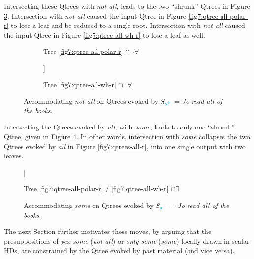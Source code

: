 Intersecting these Qtrees with \textit{not all}, leads to the two ``shrunk'' Qtrees in Figure \ref{fig7:qtrees-all-inter-notall}. Intersection with \textit{not all} caused the input Qtree in Figure \ref{fig7:qtree-all-polar-r} to lose a leaf and be reduced to a single root. Intersection with \textit{not all} caused the input Qtree in Figure \ref{fig7:qtree-all-wh-r} to lose a leaf as well.

\begin{figure}[H]
	\centering
	\begin{subfigure}[b]{.45\linewidth}
		\centering
		\begin{forest}
		\end{forest}
		\caption[]{Tree \ref{fig7:qtree-all-polar-r} $\cap\neg\forall$}\label{fig7:qtree-all-polar-inter-notall}
	\end{subfigure}
	\hfill
	\begin{subfigure}[b]{.45\linewidth}
		\centering
		\begin{forest}
			[{CS$\cap\neg\forall$}[$\neg\exists$][$\exists\wedge\neg\forall$]]
		\end{forest}
		\caption[]{Tree \ref{fig7:qtree-all-wh-r} $\cap\neg\forall$.}\label{fig7:qtree-all-wh-inter-notall}
	\end{subfigure}
	\caption[]{Accommodating \textit{not all} on Qtrees evoked by $S_{\textbf{\textcolor{cyan}{s$^+$}}}$ = \textit{Jo read all of the books}. }\label{fig7:qtrees-all-inter-notall}
\end{figure}

Intersecting the Qtrees evoked by \textit{all}, with \textit{some}, leads to only one ``shrunk'' Qtree, given in Figure \ref{fig7:qtrees-all-inter-some}. In other words, intersection with \textit{some} collapses the two Qtrees evoked by \textit{all} in Figure \ref{fig7:qtrees-all-r}, into one single output with two leaves.

\begin{figure}[H]
	\centering
		\begin{forest}
			[{CS$\cap\exists$}[$\exists\wedge\neg\forall$][\fbox{$\forall$}]]
		\end{forest}
		\caption[]{Tree \ref{fig7:qtree-all-polar-r} / \ref{fig7:qtree-all-wh-r} $\cap\exists$}\label{fig7:qtree-all-polar-inter-some}
	\caption[]{Accommodating \textit{some} on Qtrees evoked by $S_{\textbf{\textcolor{cyan}{s$^+$}}}$ = \textit{Jo read all of the books}. }\label{fig7:qtrees-all-inter-some}
\end{figure}

The next Section further motivates these moves, by arguing that the presuppositions of \textit{pex some} (\textit{not all}) or \textit{only some} (\textit{some}) locally drawn in scalar HDs, are constrained by the Qtree evoked by past material (and vice versa).




